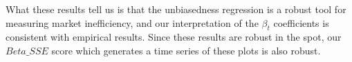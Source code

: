 What these results tell us is that the unbiasedness regression is a robust tool for measuring market inefficiency, and our interpretation of the $\beta_t$ coefficients is consistent with empirical results.
Since these results are robust in the spot, our $Beta\_SSE$ score which generates a time series of these plots is also robust.